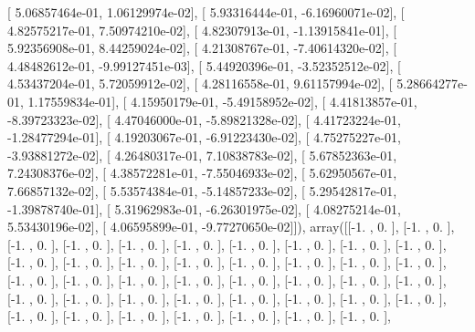 \documentclass{article}
\begin{document}
       [  5.06857464e-01,   1.06129974e-02],
       [  5.93316444e-01,  -6.16960071e-02],
       [  4.82575217e-01,   7.50974210e-02],
       [  4.82307913e-01,  -1.13915841e-01],
       [  5.92356908e-01,   8.44259024e-02],
       [  4.21308767e-01,  -7.40614320e-02],
       [  4.48482612e-01,  -9.99127451e-03],
       [  5.44920396e-01,  -3.52352512e-02],
       [  4.53437204e-01,   5.72059912e-02],
       [  4.28116558e-01,   9.61157994e-02],
       [  5.28664277e-01,   1.17559834e-01],
       [  4.15950179e-01,  -5.49158952e-02],
       [  4.41813857e-01,  -8.39723323e-02],
       [  4.47046000e-01,  -5.89821328e-02],
       [  4.41723224e-01,  -1.28477294e-01],
       [  4.19203067e-01,  -6.91223430e-02],
       [  4.75275227e-01,  -3.93881272e-02],
       [  4.26480317e-01,   7.10838783e-02],
       [  5.67852363e-01,   7.24308376e-02],
       [  4.38572281e-01,  -7.55046933e-02],
       [  5.62950567e-01,   7.66857132e-02],
       [  5.53574384e-01,  -5.14857233e-02],
       [  5.29542817e-01,  -1.39878740e-01],
       [  5.31962983e-01,  -6.26301975e-02],
       [  4.08275214e-01,   5.53430196e-02],
       [  4.06595899e-01,  -9.77270650e-02]]), array([[-1.        ,  0.        ],
       [-1.        ,  0.        ],
       [-1.        ,  0.        ],
       [-1.        ,  0.        ],
       [-1.        ,  0.        ],
       [-1.        ,  0.        ],
       [-1.        ,  0.        ],
       [-1.        ,  0.        ],
       [-1.        ,  0.        ],
       [-1.        ,  0.        ],
       [-1.        ,  0.        ],
       [-1.        ,  0.        ],
       [-1.        ,  0.        ],
       [-1.        ,  0.        ],
       [-1.        ,  0.        ],
       [-1.        ,  0.        ],
       [-1.        ,  0.        ],
       [-1.        ,  0.        ],
       [-1.        ,  0.        ],
       [-1.        ,  0.        ],
       [-1.        ,  0.        ],
       [-1.        ,  0.        ],
       [-1.        ,  0.        ],
       [-1.        ,  0.        ],
       [-1.        ,  0.        ],
       [-1.        ,  0.        ],
       [-1.        ,  0.        ],
       [-1.        ,  0.        ],
       [-1.        ,  0.        ],
       [-1.        ,  0.        ],
       [-1.        ,  0.        ],
       [-1.        ,  0.        ],
       [-1.        ,  0.        ],
       [-1.        ,  0.        ],
       [-1.        ,  0.        ],
       [-1.        ,  0.        ],
       [-1.        ,  0.        ],
       [-1.        ,  0.        ],
       [-1.        ,  0.        ],
       [-1.        ,  0.        ],
       [-1.        ,  0.        ],
\end{document}
